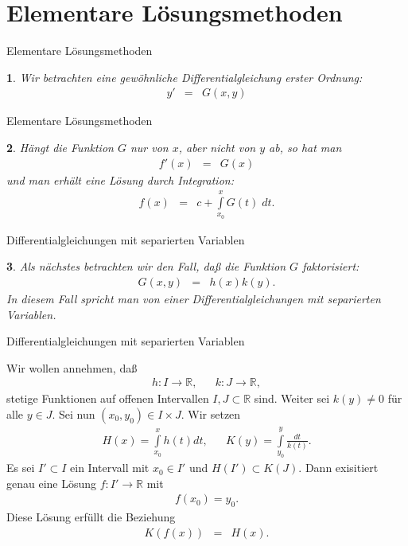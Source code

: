 \documentclass[german]{beamer}
\newcommand{\bq}{\begin{eqnarray*}}
\newcommand{\eq}{\end{eqnarray*}}
\newtheorem*{myemptytheorem}{}
\begin{document}
\section{Elementare L\"osungsmethoden}

\frame{\sectionpage}

\begin{frame}{Elementare L\"osungsmethoden}

\begin{myemptytheorem}
Wir betrachten eine gew\"ohnliche Differentialgleichung erster Ordnung:
\bq
 y' & = & G(x,y)
\eq
\end{myemptytheorem}

\end{frame}

\begin{frame}{Elementare L\"osungsmethoden}

\begin{myemptytheorem}
H\"angt die Funktion $G$ nur von $x$, aber nicht von $y$ ab, so hat man
\bq
 f'(x) & = & G(x)
\eq
und man erh\"alt eine L\"osung durch Integration:
\bq
 f(x) & = & c + \int\limits_{x_0}^x G(t) \; dt.
\eq
\end{myemptytheorem}

\end{frame}

\begin{frame}{Differentialgleichungen mit separierten Variablen}

\begin{myemptytheorem}
Als n\"achstes betrachten wir den Fall, da{\ss} die Funktion $G$ faktorisiert:
\bq
 G(x,y) & = & h(x) k(y).
\eq
In diesem Fall spricht man von einer Differentialgleichungen mit separierten Variablen.
\end{myemptytheorem}

\end{frame}

\begin{frame}{Differentialgleichungen mit separierten Variablen}

Wir wollen annehmen, da{\ss} 
\bq
 h : I \rightarrow {\mathbb R},
 & &
 k : J \rightarrow {\mathbb R},
\eq
stetige Funktionen auf offenen Intervallen $I, J \subset {\mathbb R}$ sind.
Weiter sei $k(y)\neq 0$ f\"ur alle $y\in J$.
Sei nun $(x_0,y_0) \in I \times J$.
Wir setzen
\bq
 H(x) = \int\limits_{x_0}^x h(t) dt,
 & &
 K(y) = \int\limits_{y_0}^y \frac{dt}{k(t)}.
\eq
Es sei $I' \subset I$ ein Intervall mit $x_0 \in I'$ und $H(I') \subset K(J)$.
Dann exisitiert genau eine L\"osung $f:I' \rightarrow {\mathbb R}$ mit
\bq
 f(x_0) = y_0.
\eq
Diese L\"osung erf\"ullt die Beziehung
\bq
 K\left(f(x)\right) & = & H(x).
\eq

\end{frame}
\end{document}
